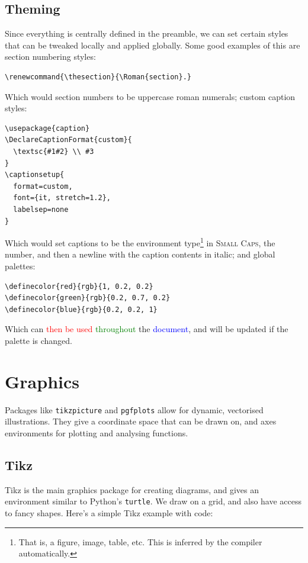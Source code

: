 \documentclass[12pt]{article}
\begin{document}
\newpage

\subsection{Theming}

Since everything is centrally defined in the preamble, we can set certain styles that can be tweaked locally and applied globally. Some good examples of this are section numbering styles:
\begin{verbatim}
\renewcommand{\thesection}{\Roman{section}.}
\end{verbatim}
Which would section numbers to be uppercase roman numerals;
custom caption styles:
\begin{verbatim}
\usepackage{caption}
\DeclareCaptionFormat{custom}{ 
  \textsc{#1#2} \\ #3 
}
\captionsetup{
  format=custom,
  font={it, stretch=1.2},
  labelsep=none
}
\end{verbatim}
Which would set captions to be the environment type\footnote{That is, a figure, image, table, etc. This is inferred by the compiler automatically.} in \textsc{Small Caps}, the number, and then a newline with the caption contents in italic; and global palettes:
\begin{verbatim}
\definecolor{red}{rgb}{1, 0.2, 0.2}
\definecolor{green}{rgb}{0.2, 0.7, 0.2}
\definecolor{blue}{rgb}{0.2, 0.2, 1}
\end{verbatim}
Which can \textcolor{red}{then be used} \textcolor{green}{throughout} the \textcolor{blue}{document}, and will be updated if the palette is changed.

\section{Graphics}
Packages like \texttt{tikzpicture} and \texttt{pgfplots} allow for dynamic, vectorised illustrations. They give a coordinate space that can be drawn on, and axes environments for plotting and analysing functions.

\newpage 

\subsection{Tikz}

Tikz is the main graphics package for creating diagrams, and gives an environment similar to Python's \texttt{turtle}. We draw on a grid, and also have access to fancy shapes.
Here's a simple Tikz example with code:
\end{document}

